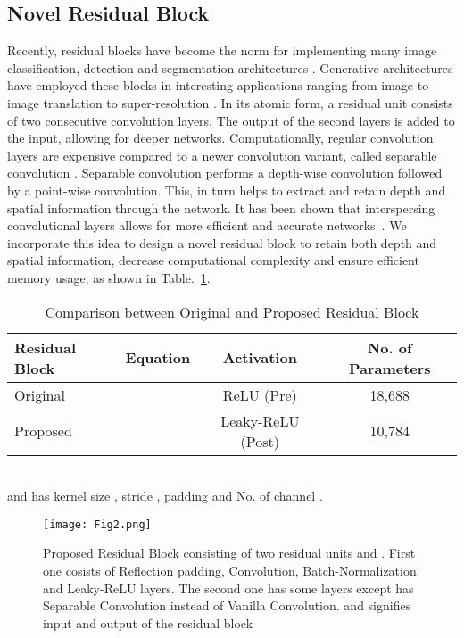 \documentclass[runningheads]{llncs}
\begin{document}
\subsection{Novel Residual Block}
\label{subsec:residualblock}

Recently, residual blocks have become the norm for implementing many image classification, detection and segmentation architectures \cite{he2016identity}. Generative architectures have employed these blocks in interesting applications ranging from image-to-image translation to super-resolution \cite{johnson2016perceptual,wang2018high}. In its atomic form, a residual unit consists of two consecutive convolution layers. The output of the second layers is added to the input, allowing for deeper networks. Computationally, regular convolution layers are expensive compared to a newer convolution variant, called separable convolution \cite{chollet2017xception}. Separable convolution performs a depth-wise convolution followed by a point-wise convolution. This, in turn helps to extract and retain depth and spatial information through the network. It has been shown that interspersing convolutional layers allows for more efficient and accurate networks~\cite{opticnet19}. We incorporate this idea to design a novel residual block to retain both depth and spatial information, decrease computational complexity and ensure efficient memory usage, as shown in Table.~\ref{table1}.

\begin{table}[htb]
\caption{Comparison between Original and Proposed Residual Block}
    \label{table1}
\centering
\begin{tabular}{l|c|c|c} 
\hline
\small Residual Block & \small Equation & \small Activation & \small No. of Parameters\\
\hline
\small Original
& \small  & \small ReLU (Pre) \cite{he2016identity}& \small 18,688 \\ 
\small Proposed  & \small  &  \small Leaky-ReLU (Post) & \small 10,784\\ 
\hline
\end{tabular}
\footnotesize
\\  and  has kernel size , stride , padding  and No. of channel .
\end{table}


\begin{figure}[htb]
    \centering
    \texttt{[image: Fig2.png]}
    \caption{Proposed Residual Block consisting of two residual units  and . First one cosists of Reflection padding, Convolution, Batch-Normalization and Leaky-ReLU layers. The second one has some layers except has Separable Convolution instead of Vanilla Convolution.  and  signifies input and output of the residual block} 
    \label{fig2}
\end{figure}
\end{document}
